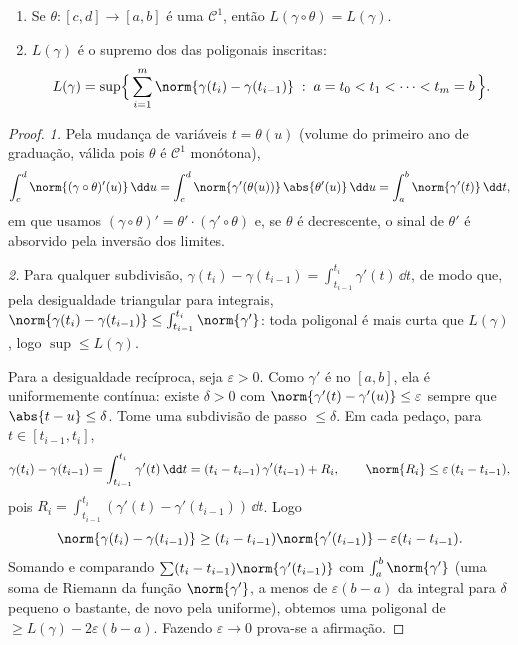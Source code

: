 \begin{theorem}\label{thm:b2:curves:lengthinv}
\leavevmode
\begin{enumerate}
\item Se $\theta \colon [c, d] \to [a, b]$ é uma 
$\mathcal{C}^1$, então $L(\gamma \circ \theta) = L(\gamma)$.
\item $L(\gamma)$ é o supremo dos  das
poligonais inscritas:
\[
L(\gamma)
= \sup\Bigl\{\, \sum_{i=1}^{m} \norm{\gamma(t_i) -
\gamma(t_{i-1})} \;:\; a = t_0 < t_1 < \dots < t_m = b \,\Bigr\}.
\]
\end{enumerate}
\end{theorem}

\begin{proof}
\emph{1.} Pela mudança de variáveis $t = \theta(u)$ (volume do primeiro ano de
graduação, válida pois $\theta$ é $\mathcal{C}^1$ monótona),
\[
\int_c^d \norm{(\gamma\circ\theta)'(u)}\,\dd u
= \int_c^d \norm{\gamma'(\theta(u))}\,\abs{\theta'(u)}\,\dd u
= \int_a^b \norm{\gamma'(t)}\,\dd t ,
\]
em que usamos $(\gamma\circ\theta)' = \theta'\cdot
(\gamma'\circ\theta)$ e, se $\theta$ é decrescente, o sinal de
$\theta'$ é absorvido pela inversão dos limites.

\emph{2.} Para qualquer subdivisão, $\gamma(t_i) - \gamma(t_{i-1}) =
\int_{t_{i-1}}^{t_i}\gamma'(t)\,\dd t$, de modo que, pela desigualdade
triangular para integrais, $\norm{\gamma(t_i) - \gamma(t_{i-1})}
\leq \int_{t_{i-1}}^{t_i}\norm{\gamma'}$: toda poligonal é mais curta
que $L(\gamma)$, logo $\sup \leq L(\gamma)$.

Para a desigualdade recíproca, seja $\varepsilon > 0$. Como $\gamma'$
é  no  $[a,b]$, ela é uniformemente contínua:
existe $\delta > 0$ com $\norm{\gamma'(t) - \gamma'(u)} \leq
\varepsilon$ sempre que $\abs{t - u} \leq \delta$. Tome uma subdivisão
de passo $\leq \delta$. Em cada pedaço, para $t \in [t_{i-1}, t_i]$,
\[
\gamma(t_i) - \gamma(t_{i-1})
= \int_{t_{i-1}}^{t_i}\gamma'(t)\,\dd t
= (t_i - t_{i-1})\,\gamma'(t_{i-1}) + R_i,
\qquad
\norm{R_i} \leq \varepsilon\,(t_i - t_{i-1}),
\]
pois $R_i = \int_{t_{i-1}}^{t_i}(\gamma'(t) -
\gamma'(t_{i-1}))\,\dd t$. Logo
\[
\norm{\gamma(t_i) - \gamma(t_{i-1})}
\geq (t_i - t_{i-1})\norm{\gamma'(t_{i-1})}
- \varepsilon (t_i - t_{i-1}) .
\]
Somando e comparando $\sum (t_i -
t_{i-1})\norm{\gamma'(t_{i-1})}$ com $\int_a^b\norm{\gamma'}$ (uma
soma de Riemann da função  $\norm{\gamma'}$, a menos de
$\varepsilon(b - a)$ da integral para $\delta$ pequeno o bastante, de novo pela
 uniforme), obtemos uma poligonal de  $\geq
L(\gamma) - 2\varepsilon(b - a)$. Fazendo $\varepsilon \to 0$
prova-se a afirmação.
\end{proof}

